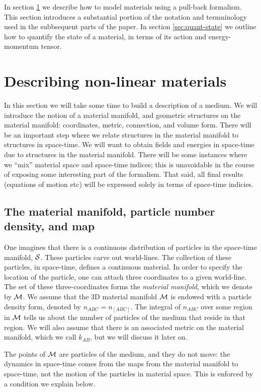 In section \ref{sec:desr-n-l-m} we describe how to model materials using a pull-back formalism. This section introduces a substantial portion of the notation and termninology used in the subbsequent parts of the paper. In section \ref{sec:quant-state} we outline how to quantify the state of a material, in terms of its action and energy-momentum tensor.


\section{Describing non-linear materials}
\label{sec:desr-n-l-m}
In this section we will take some time to build a description of a medium. We will introduce the notion of a material manifold, and geometric structures on the material manifold: coordinates, metric, connection, and volume form. There will be an important step where we relate structures in the material manifold to structures in space-time. We will want to obtain fields and energies in space-time due to structures in the material manifold. There will be some instances where we ``mix'' material space and space-time indices; this is   unavoidable in the course of exposing some interesting part of the formalism. That said, all final results (equations of motion etc) will be expressed solely in terms of space-time indicies.
\subsection{The material manifold,  particle number density, and map}
\label{sec:mpnd}
One imagines that there is a continuous distribution of particles in the space-time manifold, $\mathcal{S}$. These particles carve out world-lines. The collection of these particles, in space-time, defines a continuous material. In order to specify the location of the particle, one can attach three coordinates to a given world-line. The set of these three-coordinates forms the \textit{material manifold}, which we denote by $\mathcal{M}$. We  assume that the 3D material manifold $\mathcal{M}$   is endowed with a particle density form, denoted by $n_{ABC} = n_{[ABC]}$.  The integral of $n_{ABC}$ over some region in $\mathcal{M}$ tells us about the number of particles of the medium that reside in that region. We will also assume that there is an associated metric on the material manifold, which we call $k_{ AB}$, but we will discuss it   later on. 



The points of $\mathcal{M}$ are  particles of the medium, and they do not move: the dynamics in space-time comes from the maps from the material manifold to space-time, not the motion of the particles in material space.  This is enforced by a condition we explain below. 

